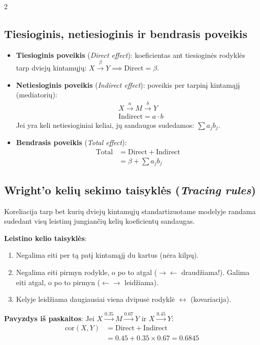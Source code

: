 \documentclass[9pt,a4paper]{article}
\begin{document}
\begin{multicols*}{2}
\subsection{Tiesioginis, netiesioginis ir bendrasis poveikis}
\begin{itemize}
    \item \textbf{Tiesioginis poveikis} (\textit{Direct effect}): koeficientas ant tiesioginės rodyklės tarp dviejų kintamųjų: $X \xrightarrow{\beta} Y \implies \text{Direct} = \beta$.
    \item \textbf{Netiesioginis poveikis} (\textit{Indirect effect}): poveikis per tarpinį kintamąjį (mediatorių):
    \begin{align*}
        &X \xrightarrow{a} M \xrightarrow{b} Y \\
        &\text{Indirect} = a \cdot b
    \end{align*}
    Jei yra keli netiesioginiai keliai, jų sandaugos sudedamos: $\sum a_j b_j$.
    \item \textbf{Bendrasis poveikis} (\textit{Total effect}):
    \begin{align*}
        \text{Total} &= \text{Direct} + \text{Indirect} \\
        &= \beta + \sum a_j b_j
    \end{align*}
\end{itemize}

\subsection{Wright'o kelių sekimo taisyklės (\textit{Tracing rules})}
Koreliacija tarp bet kurių dviejų kintamųjų standartizuotame modelyje randama sudedant visų leistinų jungiančių kelių koeficientų sandaugas.

\textbf{Leistino kelio taisyklės}:
\begin{enumerate}
    \item Negalima eiti per tą patį kintamąjį du kartus (nėra kilpų).
    \item Negalima eiti pirmyn rodykle, o po to atgal ($\to \leftarrow$ draudžiama!). Galima eiti atgal, o po to pirmyn ($\leftarrow \to$ leidžiama).
    \item Kelyje leidžiama daugiausiai viena dvipusė rodyklė $\leftrightarrow$ (kovariacija).
\end{enumerate}

\textbf{Pavyzdys iš paskaitos}:
Jei $X \xrightarrow{0.35} M \xrightarrow{0.67} Y$ ir $X \xrightarrow{0.45} Y$:
\begin{align*}
    \text{cor}(X, Y) &= \text{Direct} + \text{Indirect} \\
    &= 0.45 + 0.35 \times 0.67 = 0.6845
\end{align*}


\end{multicols*}
\end{document}
